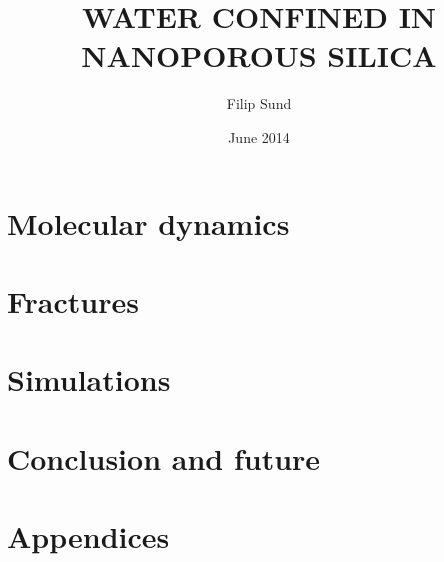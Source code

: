 \documentclass[twoside,english,a4paper,12pt]{uiofysmaster}
\author{Filip Sund}
\title{\uppercase{Water confined in\\ nanoporous silica}}
\date{June 2014}
\begin{document}

\cleardoublepage





\tableofcontents



\part{Molecular dynamics}
    
%     
    
    
    
    

\part{Fractures}
    
    
    
    
    

\part{Simulations}
    
    
    
    
    

\part{Conclusion and future}
    
%     

\part{Appendices}
\begin{appendix}
    
    
\end{appendix}

\listoffigures
\listoftables
\listoflistings
\printbibliography

\listoftodos
\end{document}
